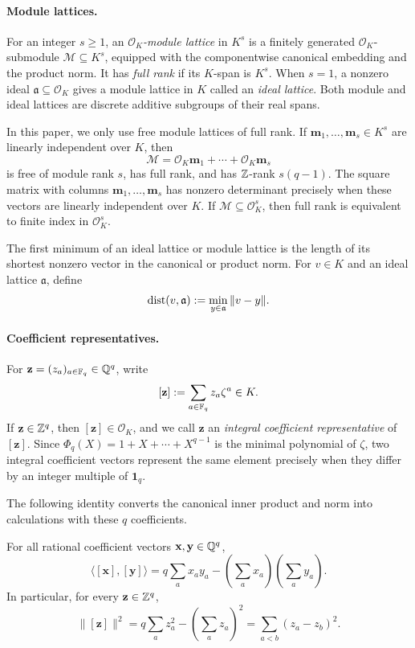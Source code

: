 \paragraph{Module lattices.}
For an integer $s\ge1$, an \emph{$\mathcal{O}_K$-module lattice} in
$K^s$ is a finitely generated $\mathcal{O}_K$-submodule
$\mathcal M\subseteq K^s$, equipped with the componentwise canonical
embedding and the product norm.  It has \emph{full rank} if its $K$-span is
$K^s$.  When $s=1$, a nonzero ideal
$\mathfrak a\subseteq\mathcal{O}_K$ gives a module lattice in $K$ called an
\emph{ideal lattice}.  Both module and ideal lattices are discrete additive
subgroups of their real spans.

In this paper, we only use free module lattices of full rank.  If
$\mathbf m_1,\ldots,\mathbf m_s\in K^s$ are linearly independent over $K$, then
\[
 \mathcal M=\mathcal{O}_K\mathbf m_1+\cdots+\mathcal{O}_K\mathbf m_s
\]
is free of module rank $s$, has full rank, and has $\mathbb Z$-rank
$s(q-1)$.  The square matrix with
columns $\mathbf m_1,\ldots,\mathbf m_s$ has nonzero determinant precisely
when these vectors are linearly independent over $K$.  If
$\mathcal M\subseteq\mathcal{O}_K^s$, then full rank is equivalent
to finite index in $\mathcal{O}_K^s$.

The first minimum of an ideal lattice or module lattice is the length of its
shortest nonzero vector in the canonical or product norm.  For $v\in K$ and
an ideal lattice $\mathfrak a$, define
\[
 \operatorname{dist}(v,\mathfrak a):=\min_{y\in\mathfrak a}\|v-y\|.
\]

\paragraph{Coefficient representatives.}
For $\mathbf z=(z_a)_{a\in\mathbb F_q}\in\mathbb Q^q$, write
\[
 [\mathbf z]:=\sum_{a\in\mathbb F_q}z_a\zeta^a\in K.
\]
If
$\mathbf z\in\mathbb Z^q$, then $[\mathbf z]\in\mathcal{O}_K$, and we call
$\mathbf z$ an \emph{integral coefficient representative} of
$[\mathbf z]$.  Since $\Phi_q(X)=1+X+\cdots+X^{q-1}$ is the minimal
polynomial of $\zeta$, two integral coefficient vectors represent the same
element precisely when they differ by an integer multiple of $\mathbf1_q$.

The following identity converts the canonical inner product and norm into
calculations with these $q$ coefficients.
\begin{lemma}
\label{lem:cyclotomic-form}
For all rational coefficient vectors $\mathbf x,\mathbf y\in\mathbb Q^q$,
\[
 \langle[\mathbf x],[\mathbf y]\rangle
 =q\sum_a x_ay_a-
 \left(\sum_a x_a\right)\left(\sum_a y_a\right).
\]
In particular, for every $\mathbf z\in\mathbb Z^q$,
\[
 \|[\mathbf z]\|^2
 =q\sum_a z_a^2-\left(\sum_a z_a\right)^2
 =\sum_{a<b}(z_a-z_b)^2.
\]
\end{lemma}

